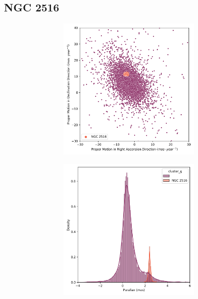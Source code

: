 \documentclass[11pt, a4paper, english]{book}
\begin{document}
\newpage

\subsection{NGC 2516}

\begin{figure}[H]
  \centering
  \begin{subfigure}{0.9\textwidth}
    \centering
    \begin{subfigure}[t]{0.30\textwidth}
      \centering
      \includegraphics[width=\textwidth]{../figures/ngc_2516/pm_ngc_2516.png}
    \end{subfigure}
    \hfill
    \begin{subfigure}[t]{0.30\textwidth}
      \centering
      \includegraphics[width=\textwidth]{../figures/ngc_2516/parallax_ngc_2516.png}

\end{subfigure}
\end{subfigure}
\end{figure}
\end{document}

